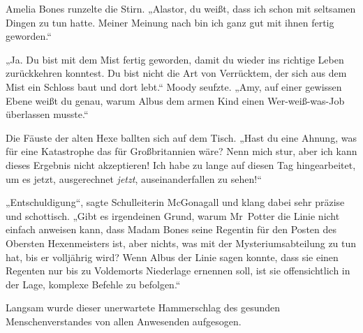 Amelia Bones runzelte die Stirn.
„Alastor, du weißt, dass ich schon mit seltsamen Dingen zu tun hatte. Meiner Meinung nach bin ich ganz gut mit ihnen fertig geworden.“

„Ja. Du bist mit dem Mist fertig geworden, damit du wieder ins richtige Leben zurückkehren konntest. Du bist nicht die Art von Verrücktem, der sich aus dem Mist ein Schloss baut und dort lebt.“
Moody seufzte.
„Amy, auf einer gewissen Ebene weißt du genau, warum Albus dem armen Kind einen Wer-weiß-was-Job überlassen musste.“

Die Fäuste der alten Hexe ballten sich auf dem Tisch.
„Hast du eine Ahnung, was für eine Katastrophe das für Großbritannien wäre? Nenn mich stur, aber ich kann dieses Ergebnis nicht akzeptieren! Ich habe zu lange auf diesen Tag hingearbeitet, um es jetzt, ausgerechnet \emph{jetzt}, auseinanderfallen zu sehen!“

„Entschuldigung“, sagte Schulleiterin McGonagall und klang dabei sehr präzise und schottisch. „Gibt es irgendeinen Grund, warum Mr~Potter die Linie nicht einfach anweisen kann, dass Madam Bones seine Regentin für den Posten des Obersten Hexenmeisters ist, aber nichts, was mit der Mysteriumsabteilung zu tun hat, bis er volljährig wird? Wenn Albus der Linie sagen konnte, dass sie einen Regenten nur bis zu Voldemorts Niederlage ernennen soll, ist sie offensichtlich in der Lage, komplexe Befehle zu befolgen.“

Langsam wurde dieser unerwartete Hammerschlag des gesunden Menschenverstandes von allen Anwesenden aufgesogen.

